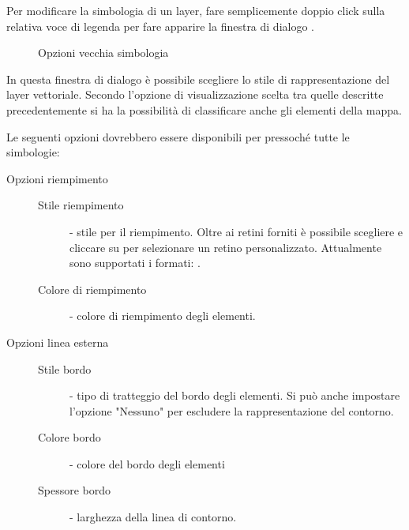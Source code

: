 Per modificare la simbologia di un layer, fare semplicemente doppio click
sulla relativa voce di legenda per fare apparire la finestra di dialogo
.

\begin{figure}[ht]
\centering
\caption{Opzioni vecchia simbologia \nixcaption}
   \hspace{1cm}
   \hspace{1cm}
   \hspace{1cm}
\end{figure}

 \label{sec:style_options} 
In questa finestra di dialogo è possibile scegliere lo stile di
rappresentazione del layer vettoriale. Secondo l'opzione di visualizzazione
scelta tra quelle descritte precedentemente si ha la possibilità di
classificare anche gli elementi della mappa.

Le seguenti opzioni dovrebbero essere disponibili per pressoché tutte le
simbologie:

\begin{description}
\item[Opzioni riempimento]
\begin{description}
 \item[Stile riempimento] - stile per il riempimento. Oltre ai retini forniti è 
 possibile scegliere  e cliccare su 
 \browsebutton per selezionare un retino personalizzato. Attualmente sono supportati 
 i formati: .
 \item[Colore di riempimento] - colore di riempimento degli elementi.
\end{description}
\item[Opzioni linea esterna]
\begin{description}
 \item[Stile bordo] - tipo di tratteggio del bordo degli elementi. Si può
 anche impostare l'opzione "Nessuno" per escludere la rappresentazione
 del contorno.
 \item[Colore bordo] - colore del bordo degli elementi
 \item[Spessore bordo] - larghezza della linea di contorno.
\end{description}
\end{description}

